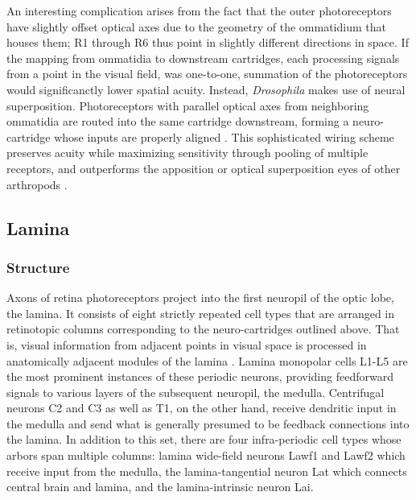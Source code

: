 An interesting complication arises from the fact that the outer photoreceptors have slightly offset optical axes due to the geometry of the ommatidium that houses them; R1 through R6 thus point in slightly different directions in space. If the mapping from ommatidia to downstream cartridges, each processing signals from a point in the visual field, was one-to-one, summation of the photoreceptors would significanctly lower spatial acuity. Instead, \textit{Drosophila} makes use of neural superposition. Photoreceptors with parallel optical axes from neighboring ommatidia are routed into the same cartridge downstream, forming a neuro-cartridge whose inputs are properly aligned \citep{Trujillo:1966aa,Braitenberg:1967aa}. This sophisticated wiring scheme
preserves acuity while maximizing sensitivity through pooling of multiple receptors, and outperforms the apposition or optical superposition eyes of other arthropods \citep{Kirschfeld:1967aa}.

\subsection{Lamina}

\subsubsection{Structure}
Axons of retina photoreceptors project into the first neuropil of the optic lobe, the lamina. It consists of eight strictly repeated cell types that are arranged in retinotopic columns corresponding to the neuro-cartridges outlined above. That is, visual information from adjacent points in visual space is processed in anatomically adjacent modules of the lamina \citep{Fischbach:1989uw}. Lamina monopolar cells L1-L5 are the most prominent instances of these periodic neurons, providing feedforward signals to various layers of the subsequent neuropil, the medulla. Centrifugal neurons C2 and C3 as well as T1, on the other hand, receive dendritic input in the medulla and send what is generally presumed to be feedback connections into the lamina. In addition to this set, there are four infra-periodic cell types whose arbors span multiple columns: lamina wide-field neurons Lawf1 and Lawf2 which receive input from the medulla, the lamina-tangential neuron Lat which connects central brain and lamina, and the lamina-intrinsic neuron Lai.

